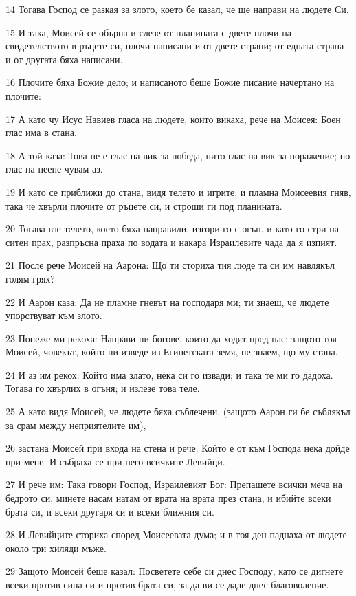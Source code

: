 \par 14 Тогава Господ се разкая за злото, което бе казал, че ще направи на людете Си.
\par 15 И така, Моисей се обърна и слезе от планината с двете плочи на свидетелството в ръцете си, плочи написани и от двете страни; от едната страна и от другата бяха написани.
\par 16 Плочите бяха Божие дело; и написаното беше Божие писание начертано на плочите:
\par 17 А като чу Исус Навиев гласа на людете, които викаха, рече на Моисея: Боен глас има в стана.
\par 18 А той каза: Това не е глас на вик за победа, нито глас на вик за поражение; но глас на пеене чувам аз.
\par 19 И като се приближи до стана, видя телето и игрите; и пламна Моисеевия гняв, така че хвърли плочите от ръцете си, и строши ги под планината.
\par 20 Тогава взе телето, което бяха направили, изгори го с огън, и като го стри на ситен прах, разпръсна праха по водата и накара Израилевите чада да я изпият.
\par 21 После рече Моисей на Аарона: Що ти сториха тия люде та си им навлякъл голям грях?
\par 22 И Аарон каза: Да не пламне гневът на господаря ми; ти знаеш, че людете упорствуват към злото.
\par 23 Понеже ми рекоха: Направи ни богове, които да ходят пред нас; защото тоя Моисей, човекът, който ни изведе из Египетската земя, не знаем, що му стана.
\par 24 И аз им рекох: Който има злато, нека си го извади; и така те ми го дадоха. Тогава го хвърлих в огъня; и излезе това теле.
\par 25 А като видя Моисей, че людете бяха съблечени, (защото Аарон ги бе съблякъл за срам между неприятелите им),
\par 26 застана Моисей при входа на стена и рече: Който е от към Господа нека дойде при мене. И събраха се при него всичките Левийци.
\par 27 И рече им: Така говори Господ, Израилевият Бог: Препашете всички меча на бедрото си, минете насам натам от врата на врата през стана, и ибийте всеки брата си, и всеки другаря си и всеки ближния си.
\par 28 И Левийците сториха според Моисеевата дума; и в тоя ден паднаха от людете около три хиляди мъже.
\par 29 Защото Моисей беше казал: Посветете себе си днес Господу, като се дигнете всеки против сина си и против брата си, за да ви се даде днес благоволение.
